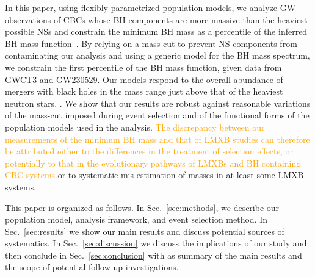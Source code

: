 \documentclass[modern]{aastex631}
\begin{document}
In this paper, using flexibly parametrized population models, we analyze GW
observations of CBCs whose BH components are more massive than the heaviest
possible NSs and constrain the minimum BH mass as a percentile of the inferred
BH mass function~\citep{Farr:2010tu}.  By relying on a mass cut to prevent NS
components from contaminating our analysis and using a generic model for the BH
mass spectrum, we constrain the first percentile of the BH mass function, given
data from GWCT3 and GW230529.  Our models respond to the overall abundance of mergers
with black holes in the mass range just above that of the heaviest neutron
stars. \chcomment[id=W]{}. We show that our results are robust against reasonable variations of
the mass-cut imposed during event selection and of the functional forms of the
population models used in the analysis. \textcolor{orange}{The discrepancy
between our measurements of the minimum BH mass and that of LMXB studies can
therefore be attributed either to the differences in the treatment of selection
effects, or potentially to that in the evolutionary pathways of LMXBs and BH
containing CBC systems} or to systematic mis-estimation of
masses in at least some LMXB systems.

This paper is organized as follows. In Sec.~\ref{sec:methods}, we describe our population model, analysis framework, and event selection method. In Sec.~\ref{sec:results} we show our main results and discuss potential sources of systematics. In Sec.~\ref{sec:discussion} we discuss the implications of our study and then conclude in Sec.~\ref{sec:conclusion} with as summary of the main results and the scope of potential follow-up investigations.
\end{document}
